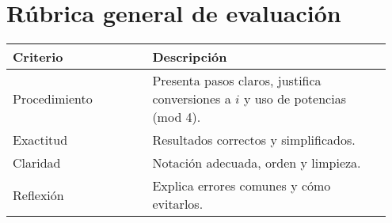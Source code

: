 
\section*{Rúbrica general de evaluación}
\begin{tabular}{p{0.35\linewidth} p{0.6\linewidth}}
\toprule
\textbf{Criterio} & \textbf{Descripción} \\
\midrule
Procedimiento & Presenta pasos claros, justifica conversiones a \(i\) y uso de potencias (mod 4). \\
Exactitud & Resultados correctos y simplificados. \\
Claridad & Notación adecuada, orden y limpieza. \\
Reflexión & Explica errores comunes y cómo evitarlos. \\
\bottomrule
\end{tabular}